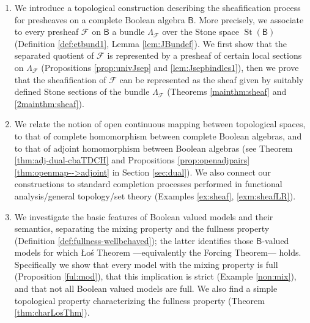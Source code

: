 \documentclass[11pt]{amsart}
\newcommand{\F}{\mathcal{F}}
\theoremstyle{plain}
\theoremstyle{definition}
\theoremstyle{plain}
\theoremstyle{remark}
\DeclareMathOperator{\St}{St}
\newcommand{\bool}[1]{\mathsf{#1}}
\newcommand{\bp}[1]{\left\lbrace #1 \right\rbrace}
\newcommand{\0}{\mathsf{0}}
\renewcommand{\1}{\mathsf{1}}
\renewcommand{\2}{\mathsf{2}}
\theoremstyle{definition}
\begin{document}
\begin{enumerate}
\item \label{diff:sheaf}
We introduce a topological construction describing the sheafification process for presheaves on a complete Boolean algebra $\bool{B}$.
More precisely, %
we associate to every presheaf $\F$ on $\bool{B}$ a bundle $\Lambda_\F$ over the Stone space $\St(\bool{B})$ (Definition \ref{def:etbund1}, Lemma \ref{lem:JBundef}). We first show that the separated quotient of $\F$ is represented by a presheaf of certain local sections on $\Lambda_\F$ (Propositions \ref{prop:univJsep} and \ref{lem:Jsepbindles1}), then we prove that the sheafification of $\F$ can be represented as the sheaf given by suitably defined Stone sections of the bundle $\Lambda_\F$ (Theorems \ref{mainthm:sheaf} and \ref{2mainthm:sheaf}). %

\item %
We relate the notion of open continuous mapping between topological spaces, to that of complete homomorphism between complete Boolean algebras, and to that of 
adjoint homomorphism between Boolean algebras (see %
Theorem \ref{thm:adj-dual-cbaTDCH} and Propositions \ref{prop:openadjpairs} \ref{thm:openmap-->adjoint} in Section \ref{sec:dual}). 
We also connect our constructions to 
standard completion processes performed in functional analysis/general topology/set theory (Examples \ref{ex:sheaf}, \ref{exm:sheafLR}).

\item \label{full:mix} We investigate the basic features of Boolean valued models and their semantics, separating the mixing property and the fullness property (Definition \ref{def:fullness-wellbehaved}); the latter
identifies those $\bool{B}$-valued models for which \L o\'s Theorem ---equivalently  the Forcing Theorem--- holds. Specifically we show that every model with the mixing property is full (Proposition \ref{ful:mod}), that this implication is strict 
(Example \ref{non:mix}), 
and that not all 
Boolean valued models are full.
We also find a simple topological property characterizing the fullness property (Theorem \ref{thm:charLosThm}).



\end{enumerate}
\end{document}

